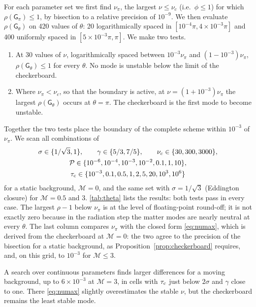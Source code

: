 \documentclass[preprint,12pt,authoryear]{elsarticle}
\newcommand{\tenG}{\mathsf{G}}
\newcommand{\calP}{\mathcal{P}}
\newcommand{\calM}{\mathcal{M}}
\begin{document}
\begin{appendix}
For each parameter set we first find $\nu_\pi$, the largest $\nu \leq \nu_c$ (i.e.\ $\phi \leq 1$) for which $\rho(\tenG_\pi) \leq 1$, by bisection to a relative precision of $10^{-9}$. We then evaluate $\rho(\tenG_\theta)$ on 420 values of $\theta$: 20 logarithmically spaced in $[10^{-4}\pi, 4\times10^{-3}\pi]$ and 400 uniformly spaced in $[5\times 10^{-3}\pi, \pi]$. We make two tests.
\begin{enumerate}
    \item At 30 values of $\nu$, logarithmically spaced between $10^{-3}\nu_\pi$ and $(1 - 10^{-3})\nu_\pi$, $\rho(\tenG_\theta) \leq 1$ for every $\theta$. No mode is unstable below the limit of the checkerboard.
    \item Where $\nu_\pi < \nu_c$, so that the boundary is active, at $\nu = (1 + 10^{-3})\nu_\pi$ the largest $\rho(\tenG_\theta)$ occurs at $\theta = \pi$. The checkerboard is the first mode to become unstable.
\end{enumerate}
Together the two tests place the boundary of the complete scheme within $10^{-3}$ of $\nu_\pi$. We scan all combinations of
\begin{equation}
\begin{gathered}
    \sigma \in \{1/\sqrt{3}, 1\}, \qquad \gamma \in \{5/3, 7/5\}, \qquad \nu_c \in \{30, 300, 3000\}, \\
    \calP \in \{10^{-6}, 10^{-4}, 10^{-3}, 10^{-2}, 0.1, 1, 10\}, \\
    \tau_{\rm c} \in \{10^{-3}, 0.1, 0.5, 1, 2, 5, 20, 10^3, 10^6\}
\end{gathered}
\label{eq:theta_params}
\end{equation}
for a static background, $\calM = 0$, and the same set with $\sigma = 1/\sqrt{3}$ (Eddington closure) for $\calM = 0.5$ and 3. \autoref{tab:theta} lists the results: both tests pass in every case. The largest $\rho - 1$ below $\nu_\pi$ is at the level of floating-point round-off; it is not exactly zero because in the radiation step the matter modes are nearly neutral at every $\theta$. The last column compares $\nu_\pi$ with the closed form \autoref{eq:numax}, which is derived from the checkerboard at $\calM = 0$: the two agree to the precision of the bisection for a static background, as Proposition~\ref{prop:checkerboard} requires, and, on this grid, to $10^{-3}$ for $\calM \leq 3$.

A search over continuous parameters finds larger differences for a moving background, up to $6\times10^{-3}$ at $\calM = 3$, in cells with $\tau_{\rm c}$ just below $2\sigma$ and $\gamma$ close to one. There \autoref{eq:numax} slightly overestimates the stable $\nu$, but the checkerboard remains the least stable mode.


\end{appendix}
\end{document}
